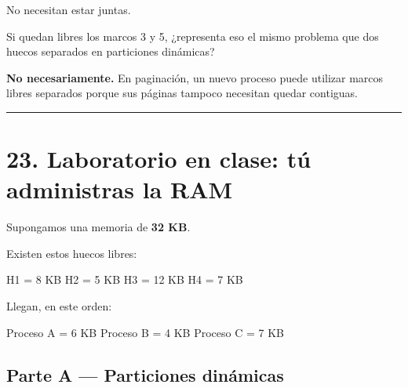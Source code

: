 \documentclass[
  spanish,
  letterpaper,
]{scrbook}
\newenvironment{Shaded}{\begin{snugshade}}{\end{snugshade}}
\newcommand{\NormalTok}[1]{\textcolor[rgb]{0.00,0.23,0.31}{#1}}
\begin{document}
No necesitan estar juntas.

\begin{tcolorbox}[enhanced jigsaw, arc=.35mm, bottomrule=.15mm, bottomtitle=1mm, breakable, colback=white, colbacktitle=quarto-callout-tip-color!10!white, colframe=quarto-callout-tip-color-frame, coltitle=black, left=2mm, leftrule=.75mm, opacityback=0, opacitybacktitle=0.6, rightrule=.15mm, title=\textcolor{quarto-callout-tip-color}{\faLightbulb}\hspace{0.5em}{Pregunta para discutir}, titlerule=0mm, toprule=.15mm, toptitle=1mm]

Si quedan libres los marcos 3 y 5, ¿representa eso el mismo problema que
dos huecos separados en particiones dinámicas?

\textbf{No necesariamente.} En paginación, un nuevo proceso puede
utilizar marcos libres separados porque sus páginas tampoco necesitan
quedar contiguas.

\end{tcolorbox}

\begin{center}\rule{0.5\linewidth}{0.5pt}\end{center}


\chapter{23. Laboratorio en clase: tú administras la
RAM}\label{laboratorio-en-clase-tuxfa-administras-la-ram}

Supongamos una memoria de \textbf{32 KB}.

Existen estos huecos libres:

\begin{Shaded}
\begin{Highlighting}[]
\NormalTok{H1 = 8 KB}
\NormalTok{H2 = 5 KB}
\NormalTok{H3 = 12 KB}
\NormalTok{H4 = 7 KB}
\end{Highlighting}
\end{Shaded}

Llegan, en este orden:

\begin{Shaded}
\begin{Highlighting}[]
\NormalTok{Proceso A = 6 KB}
\NormalTok{Proceso B = 4 KB}
\NormalTok{Proceso C = 7 KB}
\end{Highlighting}
\end{Shaded}

\section{Parte A --- Particiones
dinámicas}\label{parte-a-particiones-dinuxe1micas}
\end{document}
